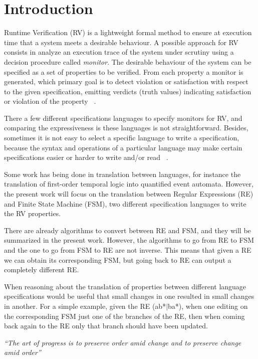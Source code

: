 \section{Introduction}
Runtime Verification (RV) is a lightweight formal method to ensure at execution time that a system meets a desirable behaviour. A possible approach for RV consists in analyze an execution trace of the system under scrutiny using a decision procedure called \textit{monitor}. The desirable behaviour of the system can be specified as a set of properties to be verified. From each property a monitor is generated, which primary goal is to detect violation or satisfaction with respect to the given specification, emitting verdicts (truth values) indicating satisfaction or violation of the property ~\cite{rv2,rv3,rvart}.  

There a few different specifications languages to specify monitors for RV, and comparing the expressiveness is these languages is not straightforward. Besides, sometimes it is not easy to select a specific language to write a specification, because the syntax and operations of a particular language may make certain specifications easier or harder to write and/or read ~\cite{rv2,rvart}. 

Some work has being done in translation between languages, for instance the translation of first-order temporal logic into quantified event automata. However, the present work will focus on the translation between Regular Expressions (RE) and Finite State Machine (FSM), two different specification languages to write the RV properties.

There are already algorithms to convert between RE and FSM, and they will be summarized in the present work. However, the algorithms to go from RE to FSM and the one to go from FSM to RE are not inverse. This means that given a RE we can obtain its corresponding FSM, but going back to RE can output a completely different RE. 

When reasoning about the translation of properties between different language specifications would be useful that small changes in one resulted in small changes in another. For a simple example, given the RE (ab*$|$ba*), when one editing on the corresponding FSM just one of the branches of the RE, then when coming back again to the RE only that branch should have been updated. 

\begin{center}
    \textit{``The art of progress is to preserve order amid change and to preserve change amid order''}
\end{center}

